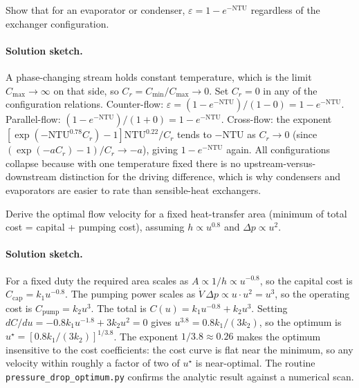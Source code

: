 \begin{exercise}
Show that for an evaporator or condenser, $\varepsilon = 1 -
e^{-\text{NTU}}$ regardless of the exchanger configuration.

\paragraph{Solution sketch.} A phase-changing stream holds constant
temperature, which is the limit $C_{\max} \to \infty$ on that side, so
$C_r = C_{\min}/C_{\max} \to 0$. Set $C_r = 0$ in any of the
configuration relations. Counter-flow: $\varepsilon = (1 - e^{-
\text{NTU}})/(1 - 0) = 1 - e^{-\text{NTU}}$. Parallel-flow: $(1 - e^{-
\text{NTU}})/(1 + 0) = 1 - e^{-\text{NTU}}$. Cross-flow: the exponent
$[\exp(-\text{NTU}^{0.78}C_r) - 1]\text{NTU}^{0.22}/C_r$ tends to
$-\text{NTU}$ as $C_r \to 0$ (since $(\exp(-aC_r) - 1)/C_r \to -a$),
giving $1 - e^{-\text{NTU}}$ again. All configurations collapse because
with one temperature fixed there is no upstream-versus-downstream
distinction for the driving difference, which is why condensers and
evaporators are easier to rate than sensible-heat exchangers.
\end{exercise}

\begin{exercise}
Derive the optimal flow velocity for a fixed heat-transfer area
(minimum of total cost = capital + pumping cost), assuming $h \propto
u^{0.8}$ and $\Delta p \propto u^2$.

\paragraph{Solution sketch.} For a fixed duty the required area scales as
$A \propto 1/h \propto u^{-0.8}$, so the capital cost is $C_{\text{cap}}
= k_1 u^{-0.8}$. The pumping power scales as $\dot{V}\,\Delta p \propto
u \cdot u^2 = u^3$, so the operating cost is $C_{\text{pump}} = k_2
u^{3}$. The total is $C(u) = k_1 u^{-0.8} + k_2 u^{3}$. Setting
$dC/du = -0.8 k_1 u^{-1.8} + 3 k_2 u^{2} = 0$ gives $u^{3.8} = 0.8
k_1/(3 k_2)$, so the optimum is $u^\star = [0.8 k_1/(3 k_2)]^{1/3.8}$.
The exponent $1/3.8 \approx 0.26$ makes the optimum insensitive to the
cost coefficients: the cost curve is flat near the minimum, so any
velocity within roughly a factor of two of $u^\star$ is near-optimal.
The routine \texttt{pressure\_drop\_optimum.py} confirms the analytic
result against a numerical scan.
\end{exercise}

